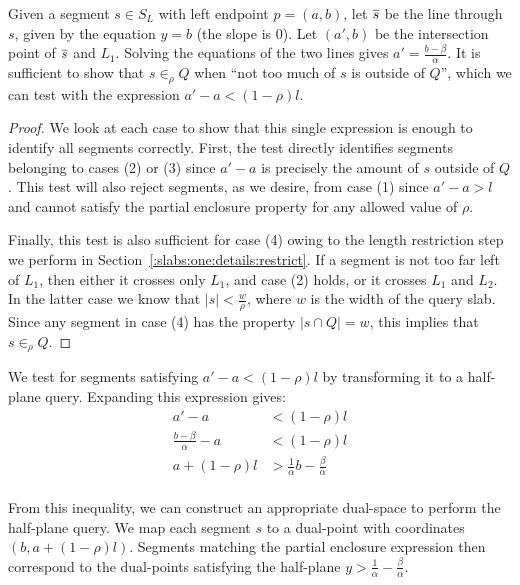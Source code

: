 Given a segment $s \in S_L$ with left endpoint $p = (a,b)$, let $\overline{s}$ be the line through $s$, given by the equation $y = b$ (the slope is 0). 
Let $(a', b)$ be the intersection point of $\overline{s}$ and $L_1$. 
Solving the equations of the two lines gives $a' = \frac{b - \beta}{\alpha}$. 
It is sufficient to show that $s \in_\rho Q$ when ``not too much of $s$ is outside of $Q$'', which we can test with the expression $a' - a < (1 - \rho)l$.

\begin{proof}
We look at each case to show that this single expression is enough to identify all segments correctly. 
First, the test directly identifies segments belonging to cases (2) or (3) since $a' - a$ is precisely the amount of $s$ outside of $Q$. 
This test will also reject segments, as we desire, from case (1) since $a' - a > l$ and cannot satisfy the partial enclosure property for any allowed value of $\rho$. 

Finally, this test is also sufficient for case (4) owing to the length restriction step we perform in Section~\ref{:slabs:one:details:restrict}. 
If a segment is not too far left of $L_1$, then either it crosses only $L_1$, and case (2) holds, or it crosses $L_1$ and $L_2$. 
In the latter case we know that $|s| < \frac{w}{\rho}$, where $w$ is the width of the query slab. 
Since any segment in case (4) has the property $|s \cap Q| = w$, this implies that $s \in_\rho Q$.
\end{proof}

We test for segments satisfying $a' - a < (1 - \rho)l$ by transforming it to a half-plane query. Expanding this expression gives:
\[
\begin{split}
a' - a &< (1 - \rho)l \\
%
\frac{b - \beta}{\alpha} - a &< (1 - \rho)l \\
%
a + (1 - \rho)l &> \frac{1}{\alpha} b - \frac{\beta}{\alpha}  \\
\end{split}
\]

From this inequality, we can construct an appropriate dual-space to perform the half-plane query. We map each segment $s$ to a dual-point with coordinates $(b, a + (1-\rho)l)$. 
Segments matching the partial enclosure expression then correspond to the dual-points satisfying the half-plane $y > \frac{1}{\alpha} - \frac{\beta}{\alpha}$.


